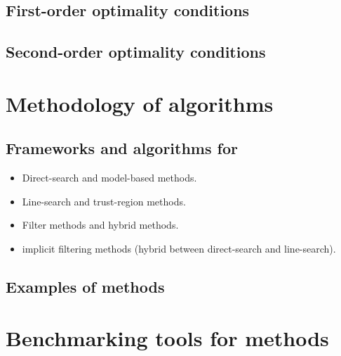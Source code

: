 \subsection{First-order optimality conditions}

\subsection{Second-order optimality conditions}

\section{Methodology of  algorithms}

\subsection{Frameworks and algorithms for }

\begin{itemize}
    \item Direct-search and model-based methods.
    \item Line-search and trust-region methods.
    \item Filter methods and hybrid methods.
    \item implicit filtering methods (hybrid between direct-search and line-search).
\end{itemize}

\subsection{Examples of  methods}

\section{Benchmarking tools for  methods}

